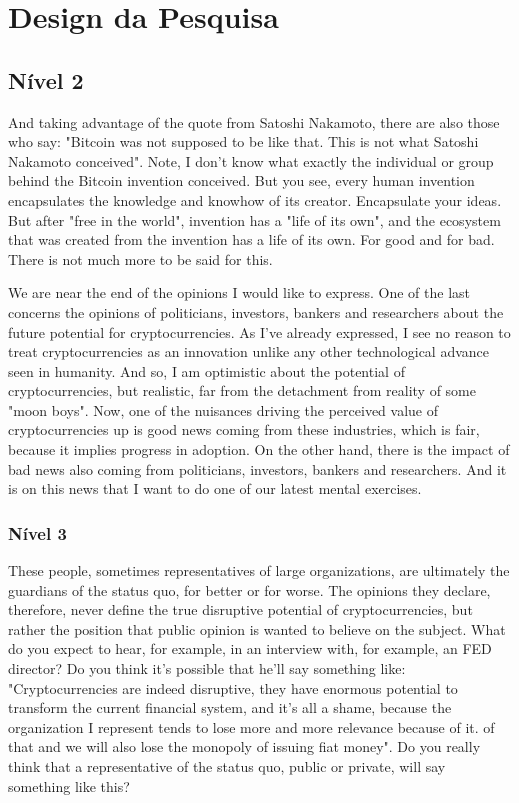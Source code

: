 \chapter{Design da Pesquisa}

\section{Nível 2}
And taking advantage of the quote from Satoshi Nakamoto, there are also those who say: "Bitcoin was not supposed to be like that. This is not what Satoshi Nakamoto conceived". Note, I don't know what exactly the individual or group behind the Bitcoin invention conceived. But you see, every human invention encapsulates the knowledge and knowhow of its creator. Encapsulate your ideas. But after "free in the world", invention has a "life of its own", and the ecosystem that was created from the invention has a life of its own. For good and for bad. There is not much more to be said for this.

We are near the end of the opinions I would like to express. One of the last concerns the opinions of politicians, investors, bankers and researchers about the future potential for cryptocurrencies. As I've already expressed, I see no reason to treat cryptocurrencies as an innovation unlike any other technological advance seen in humanity. And so, I am optimistic about the potential of cryptocurrencies, but realistic, far from the detachment from reality of some "moon boys". Now, one of the nuisances driving the perceived value of cryptocurrencies up is good news coming from these industries, which is fair, because it implies progress in adoption. On the other hand, there is the impact of bad news also coming from politicians, investors, bankers and researchers. And it is on this news that I want to do one of our latest mental exercises.

\subsection{Nível 3}
These people, sometimes representatives of large organizations, are ultimately the guardians of the status quo, for better or for worse. The opinions they declare, therefore, never define the true disruptive potential of cryptocurrencies, but rather the position that public opinion is wanted to believe on the subject. What do you expect to hear, for example, in an interview with, for example, an FED director? Do you think it's possible that he'll say something like: "Cryptocurrencies are indeed disruptive, they have enormous potential to transform the current financial system, and it's all a shame, because the organization I represent tends to lose more and more relevance because of it. of that and we will also lose the monopoly of issuing fiat money". Do you really think that a representative of the status quo, public or private, will say something like this?

